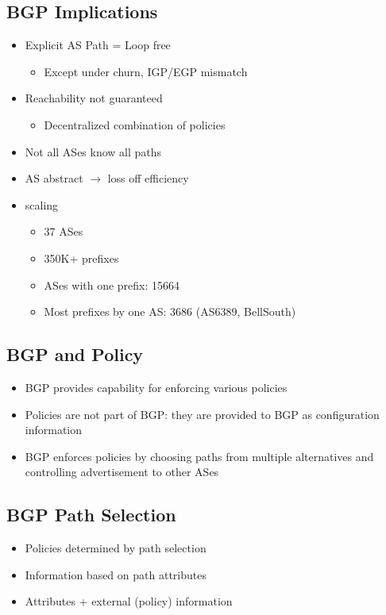 \subsection{BGP Implications}
\begin{itemize}[nosep]
    \item Explicit AS Path = Loop free
          \begin{itemize}[nosep]
              \item Except under churn, IGP/EGP mismatch
          \end{itemize}
    \item Reachability not guaranteed
          \begin{itemize}[nosep]
              \item Decentralized combination of policies
          \end{itemize}
    \item Not all ASes know all paths
    \item AS abstract $\to$ loss off efficiency
    \item scaling
          \begin{itemize}[nosep]
              \item 37 ASes
              \item 350K+ prefixes
              \item ASes with one prefix: 15664
              \item Most prefixes by one AS: 3686 (AS6389, BellSouth)
          \end{itemize}
\end{itemize}

\subsection{BGP and Policy}
\begin{itemize}[nosep]
    \item BGP provides capability for enforcing various policies
    \item Policies are not part of BGP: they are provided to BGP as configuration information
    \item BGP enforces policies by choosing paths from multiple alternatives and controlling advertisement to other ASes
\end{itemize}

\subsection{BGP Path Selection}
\begin{itemize}[nosep]
    \item Policies determined by path selection
    \item Information based on path attributes
    \item Attributes + external (policy) information
\end{itemize}

